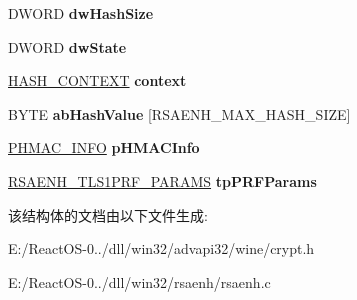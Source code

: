 \begin{DoxyCompactItemize}
D\+W\+O\+RD {\bfseries dw\+Hash\+Size}
\item 
\mbox{\label{structtag_c_r_y_p_t_h_a_s_h_af5905abe5908ea0edf025448ea33b848}} 
D\+W\+O\+RD {\bfseries dw\+State}
\item 
\mbox{\label{structtag_c_r_y_p_t_h_a_s_h_a6209feaecfdf2b30abab809b39e1f37b}} 
\hyperlink{uniontag_h_a_s_h___c_o_n_t_e_x_t}{H\+A\+S\+H\+\_\+\+C\+O\+N\+T\+E\+XT} {\bfseries context}
\item 
\mbox{\label{structtag_c_r_y_p_t_h_a_s_h_a2e76196507b4b481245a362323a00719}} 
B\+Y\+TE {\bfseries ab\+Hash\+Value} \mbox{[}R\+S\+A\+E\+N\+H\+\_\+\+M\+A\+X\+\_\+\+H\+A\+S\+H\+\_\+\+S\+I\+ZE\mbox{]}
\item 
\mbox{\label{structtag_c_r_y_p_t_h_a_s_h_a44845dc2de14915d012f0b8648aeede5}} 
\hyperlink{struct___h_m_a_c___i_n_f_o}{P\+H\+M\+A\+C\+\_\+\+I\+N\+FO} {\bfseries p\+H\+M\+A\+C\+Info}
\item 
\mbox{\label{structtag_c_r_y_p_t_h_a_s_h_a3b6c9c824f03c62884348828f2805db1}} 
\hyperlink{struct___r_s_a_e_n_h___t_l_s1_p_r_f___p_a_r_a_m_s}{R\+S\+A\+E\+N\+H\+\_\+\+T\+L\+S1\+P\+R\+F\+\_\+\+P\+A\+R\+A\+MS} {\bfseries tp\+P\+R\+F\+Params}
\end{DoxyCompactItemize}


该结构体的文档由以下文件生成\+:\begin{DoxyCompactItemize}
\item 
E\+:/\+React\+O\+S-\/0../dll/win32/advapi32/wine/crypt.\+h\item 
E\+:/\+React\+O\+S-\/0../dll/win32/rsaenh/rsaenh.\+c\end{DoxyCompactItemize}
